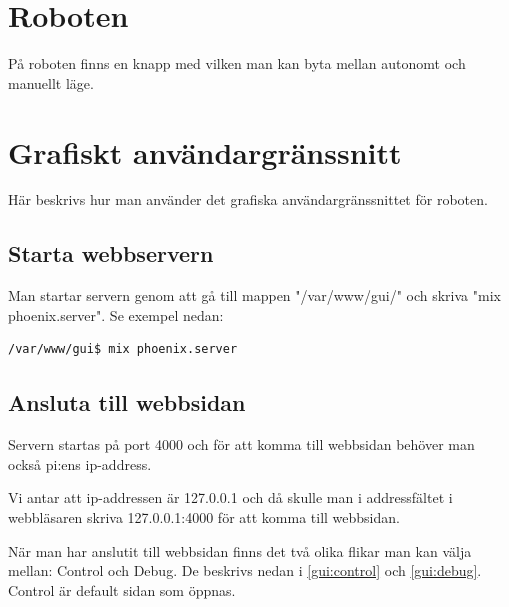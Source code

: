 \documentclass[a4paper,titlepage,12pt]{article}
\begin{document}
	
    \newpage
	\section{Roboten}
    På roboten finns en knapp med vilken man kan byta mellan autonomt och
    manuellt läge.

	

    \newpage
	\section{Grafiskt användargränssnitt}
	Här beskrivs hur man använder det grafiska användargränssnittet för roboten.
	
	\subsection{Starta webbservern}
	Man startar servern genom att gå till mappen "/var/www/gui/" och skriva "mix phoenix.server". Se exempel nedan:
	
	\begin{lstlisting}[style=linux]
	/var/www/gui$ mix phoenix.server
	\end{lstlisting}
	
	\subsection{Ansluta till webbsidan}
	Servern startas på port 4000 och för att komma till webbsidan behöver man
    också pi:ens ip-address.
	
	Vi antar att ip-addressen är 127.0.0.1 och då skulle man i addressfältet i
    webbläsaren skriva 127.0.0.1:4000 för att komma till webbsidan.
	
	När man har anslutit till webbsidan finns det två olika flikar man kan välja
    mellan: Control och Debug. De beskrivs nedan i \ref{gui:control} och
    \ref{gui:debug}. Control är default sidan som öppnas.
    \newpage
	
\end{document}
